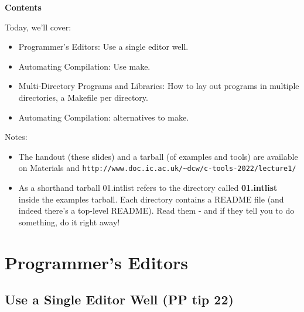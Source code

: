 \documentclass[aspectratio=169]{beamer}
\newcommand\myheading[1]{%
  \par\bigskip
  {\Large\bfseries#1}\par\smallskip}
\begin{document}
\begin{frame}[fragile]
  \myheading{Contents}
  Today, we'll cover:
      \begin{itemize}
        \item
          \alert{Programmer's Editors:} Use a single editor well.
        \item
	  \alert{Automating Compilation:} Use make.
        \item
   	  \alert{Multi-Directory Programs and Libraries:} How to lay out
	  programs in multiple directories, a Makefile per directory.
        \item
	  \alert{Automating Compilation:} alternatives to make.
	\end{itemize}
    \pause

    Notes:


    \begin{itemize}
    \item
    The handout (these slides) and a tarball (of examples and tools) are available on Materials and
    \verb+http://www.doc.ic.ac.uk/~dcw/c-tools-2022/lecture1/+

    \item
    As a shorthand \alert{tarball 01.intlist} refers to the directory
    called {\bf 01.intlist} inside the examples tarball.
    Each directory contains a README file (and indeed there's a top-level README).
    Read them - and if they tell you to do something, do it right away!
    \end{itemize}

\end{frame}



\section{Programmer's Editors}
\subsection{Use a Single Editor Well (PP tip 22)}
\end{document}
